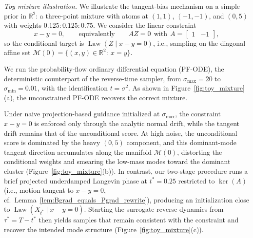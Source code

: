 \documentclass[twoside,11pt]{article}
\newcommand{\R}{\mathbb{R}}
\newcommand{\Mc}{\mathcal{M}}
\newcommand{\Law}{\operatorname{Law}}
\numberwithin{equation}{section}
\begin{document}
\medskip
\noindent\emph{Toy mixture illustration.}
We illustrate the tangent-bias mechanism on a simple prior in \(\R^2\): a three-point mixture with atoms at
\((1,1)\), \((-1,-1)\), and \((0,5)\) with weights \(0.125:0.125:0.75\).
We consider the linear constraint
\[
x-y=0,
\qquad\text{equivalently}\qquad
AZ=0\ \ \text{with}\ \ A=\begin{bmatrix}1 & -1\end{bmatrix},
\]
so the conditional target is \(\Law(Z\mid x-y=0)\), i.e., sampling on the diagonal affine set
\(\Mc(0)=\{(x,y)\in\R^2:\ x=y\}\).

We run the probability-flow ordinary differential equation (PF-ODE), the
deterministic counterpart of the reverse-time sampler, from
\(\sigma_{\max}=20\) to \(\sigma_{\min}=0.01\), with the identification \(t=\sigma^2\).
As shown in Figure~\ref{fig:toy_mixture}(a), the unconstrained PF-ODE recovers the correct mixture.

Under naive projection-based guidance initialized at \(\sigma_{\max}\), the constraint \(x-y=0\) is enforced only
through the analytic normal drift, while the tangent drift remains that of the unconditional score.
At high noise, the unconditional score is dominated by the heavy \((0,5)\) component, and this dominant-mode tangent
direction accumulates along the manifold \(\Mc(0)\), distorting the conditional weights and smearing the low-mass modes
toward the dominant cluster (Figure~\ref{fig:toy_mixture}(b)).
In contrast, our two-stage procedure runs a brief projected underdamped Langevin phase at \(t^*=0.25\) restricted to
\(\ker(A)\) (i.e., motion tangent to \(x-y=0\), cf.~Lemma~\ref{lem:Bgrad_equals_Pgrad_rewrite}),
producing an initialization close to \(\Law(X_{t^*}\mid x-y=0)\).
Starting the surrogate reverse dynamics from \(\tau^*=T-t^*\) then yields samples that remain consistent with the
constraint and recover the intended mode structure (Figure~\ref{fig:toy_mixture}(c)).
\end{document}
